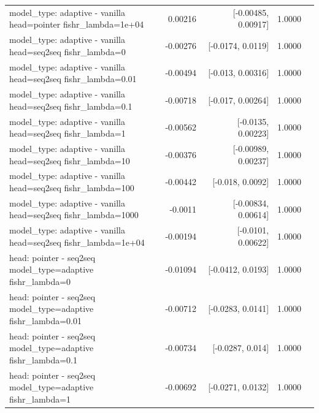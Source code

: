 \documentclass[10pt]{article}
\makeatletter
\newcommand{\stackcell}[1]{\begin{tabular}[t]{@{}l@{}}#1\end{tabular}}
\makeatother
\begin{document}
{\begin{longtable}{lrrrl}
\stackcell{model\_type: adaptive - vanilla\\\footnotesize head=pointer fishr\_lambda=1e+04 } & 0.00216 & [-0.00485, 0.00917] & 1.0000 & \\
\stackcell{model\_type: adaptive - vanilla\\\footnotesize head=seq2seq fishr\_lambda=0 } & -0.00276 & [-0.0174, 0.0119] & 1.0000 & \\
\stackcell{model\_type: adaptive - vanilla\\\footnotesize head=seq2seq fishr\_lambda=0.01 } & -0.00494 & [-0.013, 0.00316] & 1.0000 & \\
\stackcell{model\_type: adaptive - vanilla\\\footnotesize head=seq2seq fishr\_lambda=0.1 } & -0.00718 & [-0.017, 0.00264] & 1.0000 & \\
\stackcell{model\_type: adaptive - vanilla\\\footnotesize head=seq2seq fishr\_lambda=1 } & -0.00562 & [-0.0135, 0.00223] & 1.0000 & \\
\stackcell{model\_type: adaptive - vanilla\\\footnotesize head=seq2seq fishr\_lambda=10 } & -0.00376 & [-0.00989, 0.00237] & 1.0000 & \\
\stackcell{model\_type: adaptive - vanilla\\\footnotesize head=seq2seq fishr\_lambda=100 } & -0.00442 & [-0.018, 0.0092] & 1.0000 & \\
\stackcell{model\_type: adaptive - vanilla\\\footnotesize head=seq2seq fishr\_lambda=1000 } & -0.0011 & [-0.00834, 0.00614] & 1.0000 & \\
\stackcell{model\_type: adaptive - vanilla\\\footnotesize head=seq2seq fishr\_lambda=1e+04 } & -0.00194 & [-0.0101, 0.00622] & 1.0000 & \\
\stackcell{head: pointer - seq2seq\\\footnotesize model\_type=adaptive fishr\_lambda=0 } & -0.01094 & [-0.0412, 0.0193] & 1.0000 & \\
\stackcell{head: pointer - seq2seq\\\footnotesize model\_type=adaptive fishr\_lambda=0.01 } & -0.00712 & [-0.0283, 0.0141] & 1.0000 & \\
\stackcell{head: pointer - seq2seq\\\footnotesize model\_type=adaptive fishr\_lambda=0.1 } & -0.00734 & [-0.0287, 0.014] & 1.0000 & \\
\stackcell{head: pointer - seq2seq\\\footnotesize model\_type=adaptive fishr\_lambda=1 } & -0.00692 & [-0.0271, 0.0132] & 1.0000 & \\

\end{longtable}}
\end{document}
